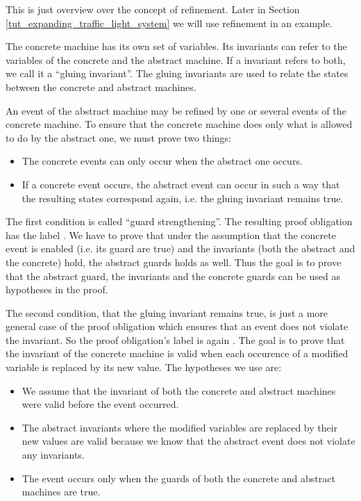 This is just overview over the concept of refinement. Later in Section \ref{tut_expanding_traffic_light_system}
we will use refinement in an example.

The concrete machine has its own set of variables. Its invariants can refer to
the variables of the concrete and the abstract machine. If a invariant refers to both,
we call it a ``gluing invariant''. The gluing invariants are
used to relate the states between the concrete and abstract machines.

An event of the abstract machine may be refined by one or several events of the concrete machine.
To ensure that the concrete machine does only what is allowed to do by the abstract one, we must prove two things:
\begin{itemize}
\item The concrete events can only occur when the abstract one occurs.
\item If a concrete event occurs, the abstract event can occur in such a way that the resulting
  states correspond again, i.e. the gluing invariant remains true.
\end{itemize}

The first condition is called ``guard strengthening''. The resulting proof obligation has the label
. We have to prove that under the assumption that the
concrete event is enabled (i.e. its guard are true) and the invariants (both the abstract and the concrete) 
hold, the abstract guards holds as well. Thus the goal is to prove that the abstract guard, the invariants and the
concrete guards can be used as hypotheses in the proof.

The second condition, that the gluing invariant remains true, is just a more general case of the proof obligation which ensures 
that an event does not violate the invariant. So the proof obligation's label is again 
. The goal is to prove that the invariant of the concrete machine is valid when each occurence of a modified variable is replaced by its new value.
The hypotheses we use are:
\begin{itemize}
\item We assume that the invariant of both the concrete and abstract machines were valid before the event occurred.
\item The abstract invariants where the modified variables are replaced by their new values are valid because we know that the abstract event does not violate any invariants.
\item The event occurs only when the guards of both the concrete and abstract machines are true.
\end{itemize}

